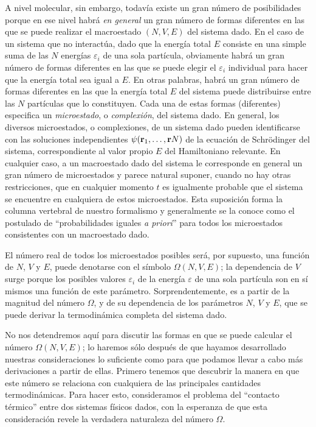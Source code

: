 \par
A nivel molecular, sin embargo, todavía existe un gran número de posibilidades porque en ese nivel habrá \emph{en general} un gran número de formas diferentes en las que se puede realizar el macroestado $(N, V, E)$ del sistema dado. En el caso de un sistema que no interactúa, dado que la energía total $E$ consiste en una simple suma de las $N$ energías $\varepsilon_{i}$ de una sola partícula, obviamente habrá un gran número de formas diferentes en las que se puede elegir el $\varepsilon_{i}$ individual para hacer que la energía total sea igual a $E$. En otras palabras, habrá un gran número de formas diferentes en las que la energía total $E$ del sistema puede distribuirse entre las $N$ partículas que lo constituyen. Cada una de estas formas (diferentes) especifica un \emph{microestado}, o \emph{complexión}, del sistema dado. En general, los diversos microestados, o complexiones, de un sistema dado pueden identificarse con las soluciones independientes $\psi (\vb{r}_{1}, \ldots, \vb{r}{N})$ de la ecuación de Schrödinger del sistema, correspondiente al valor propio $E$ del Hamiltoniano relevante. En cualquier caso, a un macroestado dado del sistema le corresponde en general un gran número de microestados y parece natural suponer, cuando no hay otras restricciones, que en cualquier momento $t$ es igualmente probable que el sistema se encuentre en cualquiera de estos microestados. Esta suposición forma la columna vertebral de nuestro formalismo y generalmente se la conoce como el postulado de \enquote{probabilidades iguales \emph{a priori}} para todos los microestados consistentes con un macroestado dado.
\par
El número real de todos los microestados posibles será, por supuesto, una función de $N$, $V$ y $E$, puede denotarse con el símbolo $\Omega (N, V, E)$; la dependencia de $V$ surge porque los posibles valores $\varepsilon_{i}$ de la energía $\varepsilon$ de una sola partícula son en sí mismos una función de este parámetro. Sorprendentemente, es a partir de la magnitud del número $\Omega$, y de su dependencia de los parámetros $N$, $V$ y $E$, que se puede derivar la termodinámica completa del sistema dado.
\par
No nos detendremos aquí para discutir las formas en que se puede calcular el número $\Omega (N, V, E)$; lo haremos sólo después de que hayamos desarrollado nuestras consideraciones lo suficiente como para que podamos llevar a cabo más derivaciones a partir de ellas. Primero tenemos que descubrir la manera en que este número se relaciona con cualquiera de las principales cantidades termodinámicas. Para hacer esto, consideramos el problema del \enquote{contacto térmico} entre dos sistemas físicos dados, con la esperanza de que esta consideración revele la verdadera naturaleza del número $\Omega$.

